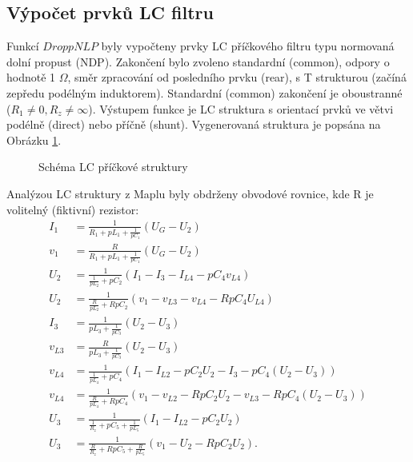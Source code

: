 \subsection{Výpočet prvků LC filtru}\label{s:VYP}
\noindent Funkcí $DroppNLP$ byly vypočteny prvky LC příčkového filtru typu normovaná dolní propust (NDP). Zakončení bylo zvoleno standardní (common), odpory o hodnotě 1 $\Omega$, směr zpracování od posledního prvku (rear), s T strukturou (začíná zepředu podélným induktorem). Standardní (common) zakončení je oboustranné ($R_1 \neq 0, R_z \neq \infty$). Výstupem funkce je LC struktura s orientací prvků ve větvi podélně (direct) nebo příčně (shunt).
Vygenerovaná struktura je popsána na Obrázku \ref{s:SCHEM}.
\begin{figure}[h]
\centering
{}
\caption{Schéma LC příčkové struktury \label{s:SCHEM}}
\end{figure}
\noindent Analýzou LC struktury z Maplu byly obdrženy obvodové rovnice, kde R je volitelný (fiktivní) rezistor:
\begin{align}
I_1 &= \frac{1}{R_1 + pL_1 + \frac{1}{pC_1}}(U_G - U_2)\\
v_1 & = \frac{R}{R_1 + pL_1 + \frac{1}{pC_1}}(U_G - U_2)\\
U_2 &= \frac{1}{\frac{1}{pL_2} + pC_2}(I_1 - I_{3} - I_{L4} - pC_4 v_{L4})\\
U_2 &= \frac{1}{\frac{R}{pL_2} + RpC_2}(v_1 - v_{L3} - v_{L4} - RpC_4 U_{L4})\\
I_{3} &= \frac{1}{pL_3 + \frac{1}{pC_3}}(U_2 - U_3)\\
v_{L3} &= \frac{R}{pL_3 + \frac{1}{pC_3}}(U_2 - U_3)\\
v_{L4} &= \frac{1}{\frac{1}{pL_4}+pC_4}(I_1 - I_{L2} - pC_2U_2 - I_{3} - pC_4 (U_2 - U_3))\\
v_{L4} &= \frac{1}{\frac{R}{pL_4}+RpC_4}(v_1 - v_{L2} - RpC_2U_2 - v_{L3} - RpC_4 (U_2 - U_3))\\
U_3 &= \frac{1}{\frac{1}{R_z}+pC_5 + \frac{1}{pL_5}}(I_1 - I_{L2} - pC_2U_2)\\
U_3 &= \frac{1}{\frac{R}{R_z}+RpC_5 + \frac{R}{pL_5}}(v_1 - U_2 - RpC_2 U_2).
\end{align}

